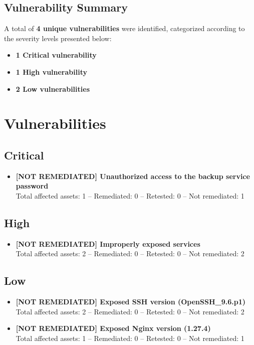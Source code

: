 \documentclass[a4paper,12pt]{article}
\begin{document}
\subsection{Vulnerability Summary}

A total of \textbf{4 unique vulnerabilities} were identified, categorized according to the severity levels presented below:

\begin{itemize}[label=--]
    \item \textbf{1 Critical vulnerability}
    \item \textbf{1 High vulnerability}
    \item \textbf{2 Low vulnerabilities}
\end{itemize}

\clearpage

\section{Vulnerabilities}

\subsection{\color{BrickRed}Critical}

\begin{itemize}
    \item \textbf{[NOT REMEDIATED] Unauthorized access to the backup service password} \\
          Total affected assets: 1 -- Remediated: 0 -- Retested: 0 -- Not remediated: 1
\end{itemize}

\subsection{\color{Red}High}

\begin{itemize}
    \item \textbf{[NOT REMEDIATED] Improperly exposed services} \\
          Total affected assets: 2 -- Remediated: 0 -- Retested: 0 -- Not remediated: 2
\end{itemize}

\subsection{\color{NavyBlue}Low}

\begin{itemize}
    \item \textbf{[NOT REMEDIATED] Exposed SSH version (OpenSSH\_9.6.p1)} \\
          Total affected assets: 2 -- Remediated: 0 -- Retested: 0 -- Not remediated: 2
    \item \textbf{[NOT REMEDIATED] Exposed Nginx version (1.27.4)} \\
          Total affected assets: 1 -- Remediated: 0 -- Retested: 0 -- Not remediated: 1
\end{itemize}
\end{document}
